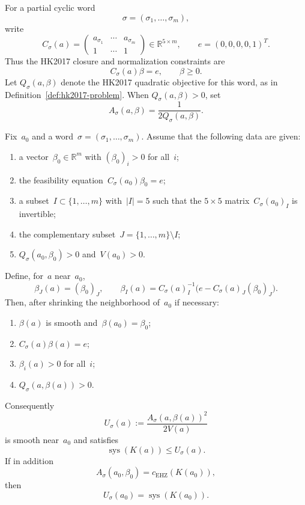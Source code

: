 For a partial cyclic word
\[
  \sigma=(\sigma_1,\ldots,\sigma_m),
\]
write
\[
  C_\sigma(a)=
  \begin{pmatrix}
    a_{\sigma_1} & \cdots & a_{\sigma_m}\\
    1            & \cdots & 1
  \end{pmatrix}
  \in\mathbb R^{5\times m},
  \qquad
  e=(0,0,0,0,1)^T.
\]
Thus the HK2017 closure and normalization constraints are
\[
  C_\sigma(a)\beta=e,\qquad \beta\geq 0.
\]
Let $Q_\sigma(a,\beta)$ denote the HK2017 quadratic objective for this word,
as in Definition~\ref{def:hk2017-problem}.  When
$Q_\sigma(a,\beta)>0$, set
\[
  A_\sigma(a,\beta)=\frac{1}{2Q_\sigma(a,\beta)}.
\]

\begin{lemma}
\label{lem:hko-feasible-section-upper-branch}
Fix~$a_0$ and a word~$\sigma=(\sigma_1,\ldots,\sigma_m)$.
Assume that the following data are given:
\begin{enumerate}
  \item a vector~$\beta_0\in\mathbb R^m$ with $(\beta_0)_i>0$ for all~$i$;
  \item the feasibility equation~$C_\sigma(a_0)\beta_0=e$;
  \item a subset~$I\subset\{1,\ldots,m\}$ with~$|I|=5$ such that
    the $5\times5$ matrix~$C_\sigma(a_0)_I$ is invertible;
  \item the complementary subset~$J=\{1,\ldots,m\}\setminus I$;
  \item $Q_\sigma(a_0,\beta_0)>0$ and~$V(a_0)>0$.
\end{enumerate}
Define, for~$a$ near~$a_0$,
\begin{equation}
\label{eq:hko-feasible-section-beta}
  \beta_J(a)=(\beta_0)_J,\qquad
  \beta_I(a)=C_\sigma(a)_I^{-1}\bigl(e-C_\sigma(a)_J(\beta_0)_J\bigr).
\end{equation}
Then, after shrinking the neighborhood of~$a_0$ if necessary:
\begin{enumerate}
  \item $\beta(a)$ is smooth and~$\beta(a_0)=\beta_0$;
  \item $C_\sigma(a)\beta(a)=e$;
  \item $\beta_i(a)>0$ for all~$i$;
  \item $Q_\sigma(a,\beta(a))>0$.
\end{enumerate}
Consequently
\[
  U_\sigma(a)
  :=
  \frac{A_\sigma(a,\beta(a))^2}{2V(a)}
\]
is smooth near~$a_0$ and satisfies
\[
  \operatorname{sys}(K(a))\leq U_\sigma(a).
\]
If in addition
\[
  A_\sigma(a_0,\beta_0)=c_{\mathrm{EHZ}}(K(a_0)),
\]
then
\[
  U_\sigma(a_0)=\operatorname{sys}(K(a_0)).
\]
\end{lemma}

